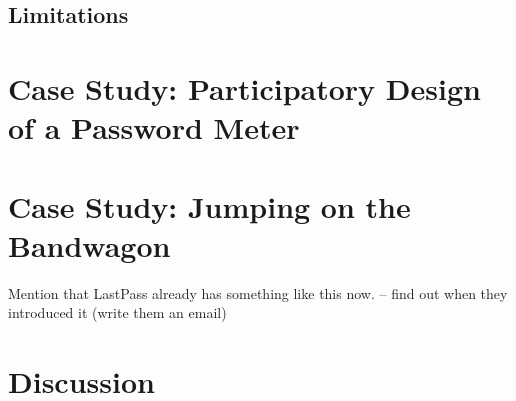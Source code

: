 \subsection{Limitations}


\section{Case Study: Participatory Design of a Password Meter}

\section{Case Study: Jumping on the Bandwagon}
Mention that LastPass already has something like this now. -- find out when they introduced it (write them an email) 

\section{Discussion}





